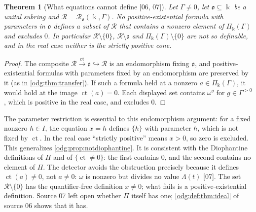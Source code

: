 \documentclass[11pt,oneside]{article}
\numberwithin{equation}{section}
\newtheorem{theorem}{Theorem}[section]
\theoremstyle{definition}
\theoremstyle{remark}
\newcommand{\ct}{\operatorname{ct}}
\newcommand{\src}[1]{\textup{\textsf{\small[#1]}}}
\begin{document}
\begin{theorem}[What equations cannot define \src{06, 07}]\label{odg:def:thm:collapse}
Let $\Gamma\ne0$, let $\mathfrak o\subseteq\Bbbk$ be a unital subring and
$\mathcal R=\mathcal R_{\mathfrak o}(\Bbbk,\Gamma)$. No positive-existential
formula with parameters in $\mathfrak o$ defines a subset of $\mathcal R$ that
contains a nonzero element of $\Pi_\Bbbk(\Gamma)$ and excludes $0$. In
particular $\mathcal R\setminus\{0\}$, $\mathcal R\setminus\mathfrak o$ and
$\Pi_\Bbbk(\Gamma)\setminus\{0\}$ are not so definable, and in the real case
neither is the strictly positive cone.
\end{theorem}
\begin{proof}
The composite $\mathcal R\xrightarrow{\ct}\mathfrak o\hookrightarrow
\mathcal R$ is an endomorphism fixing $\mathfrak o$, and positive-existential
formulas with parameters fixed by an endomorphism are preserved by it (as in
\cref{odg:thm:transfer}). If such a formula held at a nonzero
$a\in\Pi_\Bbbk(\Gamma)$, it would hold at the image $\ct(a)=0$. Each displayed set
contains $\omega^g$ for $g\in\Gamma^{>0}$, which is positive in the real case,
and excludes $0$.
\end{proof}

The parameter restriction is essential to this endomorphism argument:
for a fixed nonzero $h\in I$, the equation $x=h$ defines $\{h\}$ with
parameter $h$, which is not fixed by $\ct$. In the real case ``strictly
positive'' means $x>0$, so zero is excluded.
This generalizes \cref{odg:prop:notdiophantine}. It is consistent with the
Diophantine definitions of $\Pi$ and of $\{\ct\ne0\}$: the first contains $0$,
and the second contains no element of $\Pi$. The detector avoids the
obstruction precisely because it defines $\ct(a)\ne0$, not $a\ne0$: $\omega$
is nonzero but divides no value $\Lambda(t)$ \src{07}. The set
$\mathcal R\setminus\{0\}$ has the quantifier-free definition $x\ne0$; what
fails is a positive-existential definition. Source 07 left open whether $\Pi$
itself has one; \cref{odg:def:thm:ideal} of source 06 shows that it has.
\end{document}
